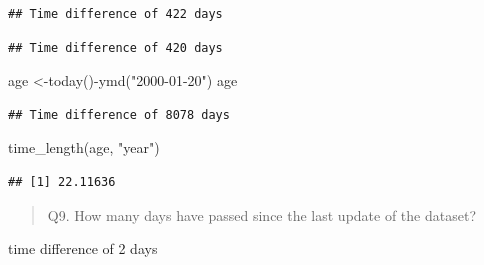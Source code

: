\documentclass[
]{article}
\newenvironment{Shaded}{\begin{snugshade}}{\end{snugshade}}
\newcommand{\DecValTok}[1]{\textcolor[rgb]{0.00,0.00,0.81}{#1}}
\newcommand{\FunctionTok}[1]{\textcolor[rgb]{0.00,0.00,0.00}{#1}}
\newcommand{\NormalTok}[1]{#1}
\newcommand{\OtherTok}[1]{\textcolor[rgb]{0.56,0.35,0.01}{#1}}
\newcommand{\SpecialCharTok}[1]{\textcolor[rgb]{0.00,0.00,0.00}{#1}}
\newcommand{\StringTok}[1]{\textcolor[rgb]{0.31,0.60,0.02}{#1}}
\begin{document}
\begin{verbatim}
## Time difference of 422 days
\end{verbatim}

\begin{Shaded}
\end{Shaded}

\begin{verbatim}
## Time difference of 420 days
\end{verbatim}

\begin{Shaded}
\begin{Highlighting}[]
\NormalTok{age }\OtherTok{\textless{}{-}}\FunctionTok{today}\NormalTok{()}\SpecialCharTok{{-}}\FunctionTok{ymd}\NormalTok{(}\StringTok{"2000{-}01{-}20"}\NormalTok{)}
\NormalTok{age}
\end{Highlighting}
\end{Shaded}

\begin{verbatim}
## Time difference of 8078 days
\end{verbatim}

\begin{Shaded}
\begin{Highlighting}[]
\FunctionTok{time\_length}\NormalTok{(age, }\StringTok{"year"}\NormalTok{)}
\end{Highlighting}
\end{Shaded}

\begin{verbatim}
## [1] 22.11636
\end{verbatim}

\begin{quote}
Q9. How many days have passed since the last update of the dataset?
\end{quote}

time difference of 2 days

\begin{Shaded}
\end{Shaded}
\end{document}
